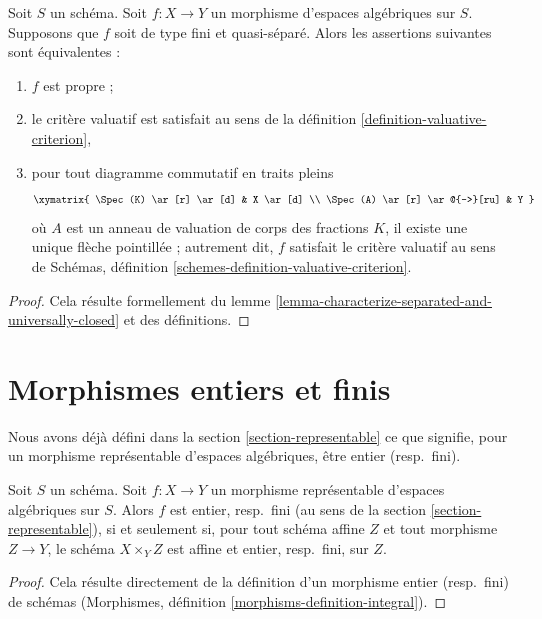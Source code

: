 \begin{lemma}
\label{lemma-characterize-proper}
Soit $S$ un schéma. Soit $f : X \to Y$ un morphisme d'espaces algébriques
sur $S$. Supposons que $f$ soit de type fini et quasi-séparé. Alors les
assertions suivantes sont équivalentes :
\begin{enumerate}
\item $f$ est propre ;
\item le critère valuatif est satisfait au sens de la définition
\ref{definition-valuative-criterion},
\item pour tout diagramme commutatif en traits pleins
$$
\xymatrix{
\Spec(K) \ar[r] \ar[d] & X \ar[d] \\
\Spec(A) \ar[r] \ar@{-->}[ru] & Y
}
$$
où $A$ est un anneau de valuation de corps des fractions $K$, il existe
une unique flèche pointillée ; autrement dit, $f$ satisfait le critère
valuatif au sens de
Schémas, définition \ref{schemes-definition-valuative-criterion}.
\end{enumerate}
\end{lemma}

\begin{proof}
Cela résulte formellement du
lemme \ref{lemma-characterize-separated-and-universally-closed}
et des définitions.
\end{proof}





\section{Morphismes entiers et finis}
\label{section-integral}

\noindent
Nous avons déjà défini dans la section \ref{section-representable}
ce que signifie, pour un morphisme représentable d'espaces algébriques,
être entier (resp.\ fini).

\begin{lemma}
\label{lemma-integral-representable}
Soit $S$ un schéma. Soit $f : X \to Y$ un morphisme représentable
d'espaces algébriques sur $S$. Alors
$f$ est entier, resp.\ fini
(au sens de la section \ref{section-representable}),
si et seulement si, pour tout schéma affine $Z$
et tout morphisme $Z \to Y$, le schéma $X \times_Y Z$ est affine et
entier, resp.\ fini, sur $Z$.
\end{lemma}

\begin{proof}
Cela résulte directement de la définition d'un morphisme entier (resp.\ fini)
de schémas
(Morphismes, définition \ref{morphisms-definition-integral}).
\end{proof}

